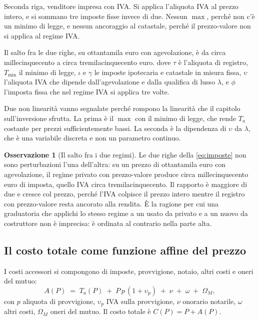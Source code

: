 \documentclass[11pt,a4paper]{article}
\theoremstyle{definition}
\newtheorem{osservazione}[definizione]{Osservazione}
\theoremstyle{plain}
\begin{document}
Seconda riga, venditore impresa con IVA. Si applica l'aliquota IVA al prezzo intero, e si sommano tre imposte fisse invece di due. Nessun $\max$, perché non c'è un minimo di legge, e nessun ancoraggio al catastale, perché il prezzo-valore non si applica al regime IVA.

Il salto fra le due righe, su ottantamila euro con agevolazione, è da circa millecinquecento a circa tremilacinquecento euro.
dove $\tau$ è l'aliquota di registro, $T_{\min}$ il minimo di legge, $\iota$ e $\gamma$ le imposte ipotecaria e catastale in misura fissa, $\upsilon$ l'aliquota IVA che dipende dall'agevolazione e dalla qualifica di lusso $\lambda$, e $\phi$ l'imposta fissa che nel regime IVA si applica tre volte.

Due non linearità vanno segnalate perché rompono la linearità che il capitolo sull'inversione sfrutta. La prima è il $\max$ con il minimo di legge, che rende $T_a$ costante per prezzi sufficientemente bassi. La seconda è la dipendenza di $\upsilon$ da $\lambda$, che è una variabile discreta e non un parametro continuo.

\begin{osservazione}[Il salto fra i due regimi]
Le due righe della \eqref{eq:imposte} non sono perturbazioni l'una dell'altra: su un prezzo di ottantamila euro con agevolazione, il regime privato con prezzo-valore produce circa millecinquecento euro di imposta, quello IVA circa tremilacinquecento. Il rapporto è maggiore di due e cresce col prezzo, perché l'IVA colpisce il prezzo intero mentre il registro con prezzo-valore resta ancorato alla rendita. È la ragione per cui una graduatoria che applichi lo stesso regime a un usato da privato e a un nuovo da costruttore non è imprecisa: è ordinata al contrario nella parte alta.
\end{osservazione}

\subsection{Il costo totale come funzione affine del prezzo}

I costi accessori si compongono di imposte, provvigione, notaio, altri costi e oneri del mutuo:
\begin{equation}
A(P) \;=\; T_a(P) \;+\; P\,p\,(1+\upsilon_p) \;+\; \nu \;+\; \omega \;+\; \Omega_M,
\label{eq:accessori}
\end{equation}
con $p$ aliquota di provvigione, $\upsilon_p$ IVA sulla provvigione, $\nu$ onorario notarile, $\omega$ altri costi, $\Omega_M$ oneri del mutuo. Il costo totale è $C(P) = P + A(P)$.
\end{document}
